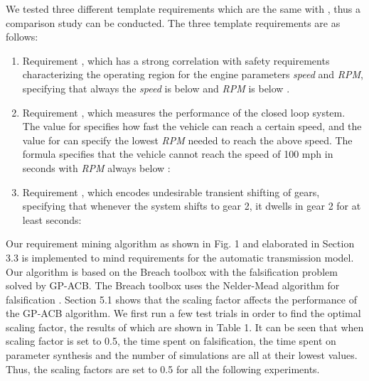 \documentclass[10pt]{article}
\theoremstyle{plain}
\begin{document}
We tested three different template requirements which are the same with \cite{jin2013mining}, thus a comparison study can be conducted. The three template requirements are as follows:
\begin{enumerate}
\item Requirement , which has a strong correlation with safety requirements characterizing the operating region for the engine parameters \textit{speed} and \textit{RPM}, specifying that always the \textit{speed} is below  and \textit{RPM} is below . 

\item Requirement , which measures the performance of the closed loop system. The value for  specifies how fast the vehicle can reach a certain speed, and the value for  can specify the lowest \textit{RPM} needed to reach the above speed. The formula specifies that the vehicle cannot reach the speed of 100 mph in  seconds with \textit{RPM} always below :

\item Requirement , which encodes undesirable transient shifting of gears, specifying that whenever the system shifts to gear 2, it dwells in gear 2 for at least  seconds:

\end{enumerate}

Our requirement mining algorithm as shown in Fig. 1 and elaborated in Section 3.3 is implemented to mind requirements for the automatic transmission model. Our algorithm is based on the Breach toolbox \cite{donze2010breach} with the falsification problem solved by GP-ACB. The Breach toolbox uses the Nelder-Mead algorithm for falsification \cite{donze2010breach,jin2013mining}. Section 5.1 shows that the scaling factor affects the performance of the GP-ACB algorithm. We first run a few test trials in order to find the optimal scaling factor, the results of which are shown in Table 1. It can be seen that when scaling factor is set to 0.5, the time spent on falsification, the time spent on parameter synthesis and the number of simulations are all at their lowest values. Thus, the scaling factors are set to 0.5 for all the following experiments.  
\end{document}
